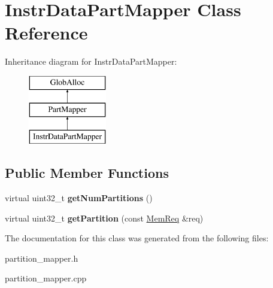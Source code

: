 \hypertarget{classInstrDataPartMapper}{\section{Instr\-Data\-Part\-Mapper Class Reference}
\label{classInstrDataPartMapper}
}
Inheritance diagram for Instr\-Data\-Part\-Mapper\-:\begin{figure}[H]
\begin{center}
\leavevmode
\includegraphics[height=3.000000cm]{classInstrDataPartMapper}
\end{center}
\end{figure}
\subsection*{Public Member Functions}
\begin{DoxyCompactItemize}
\item 
\hypertarget{classInstrDataPartMapper_a64f091e8c3737da1dd7146931f74d926}{virtual uint32\-\_\-t {\bfseries get\-Num\-Partitions} ()}\label{classInstrDataPartMapper_a64f091e8c3737da1dd7146931f74d926}

\item 
\hypertarget{classInstrDataPartMapper_a7edb4dbecd6495a2a29d4896c49958c2}{virtual uint32\-\_\-t {\bfseries get\-Partition} (const \hyperlink{structMemReq}{Mem\-Req} \&req)}\label{classInstrDataPartMapper_a7edb4dbecd6495a2a29d4896c49958c2}

\end{DoxyCompactItemize}


The documentation for this class was generated from the following files\-:\begin{DoxyCompactItemize}
\item 
partition\-\_\-mapper.\-h\item 
partition\-\_\-mapper.\-cpp\end{DoxyCompactItemize}
